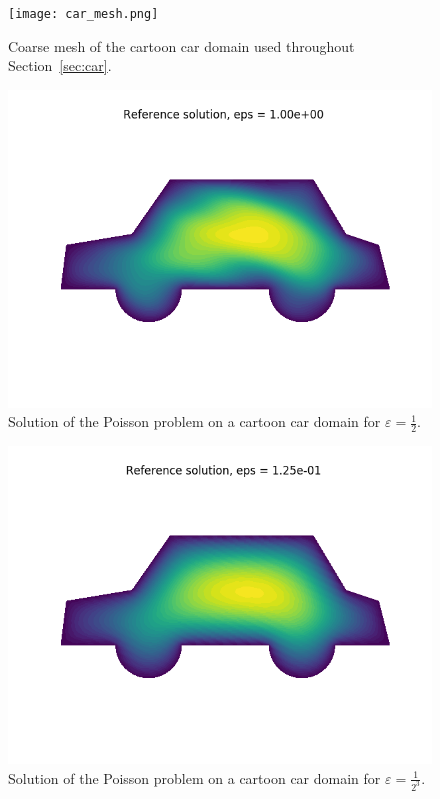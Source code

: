 \documentclass{article}
\renewcommand{\epsilon}{\varepsilon}
\begin{document}
\begin{figure}[h]
    \centering
    \texttt{[image: car\_mesh.png]}
    \caption{Coarse mesh of the cartoon car domain used throughout Section~\ref{sec:car}.}
    \label{fig:car_grid}
  \end{figure}
  \begin{figure}[h]
    \centering
    \includegraphics[width=0.8\linewidth]{car_reference_eps_power_0.png}
    \caption{Solution of the Poisson problem on a cartoon car domain for $\epsilon = \frac{1}{2}$.}
    \label{fig:car_reference_1}
  \end{figure}
  \begin{figure}[h]
    \centering
    \includegraphics[width=0.8\linewidth]{car_reference_eps_power_3.png}
    \caption{Solution of the Poisson problem on a cartoon car domain for $\epsilon = \frac{1}{2^3}$.}
    \label{fig:car_reference_3}
  \end{figure}
\end{document}
